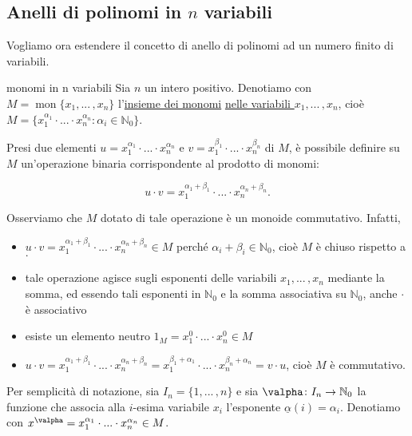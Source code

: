 
\subsection{Anelli di polinomi in $n$ variabili}

\noindent Vogliamo ora estendere il concetto di anello di polinomi ad un numero finito di variabili.

\begin{defn}{monomi in n variabili}
Sia $n$ un intero positivo. Denotiamo con $M=\operatorname{mon}\{x_1,...\,,x_n\}$ l'\underline{insieme dei monomi} 
\underline{nelle variabili $x_1,...\,,x_n$}, cioè $M=\{x_1^{\alpha_1}\cdot ...\cdot x_n^{\alpha_n}: \alpha_i\in\mathbb{N}_0\}$.
\end{defn} 
\vspace{-2mm}
\noindent Presi due elementi $u=x_1^{\alpha_1}\cdot ...\cdot x_n^{\alpha_n}$ e $v=x_1^{\beta_1}\cdot ...\cdot x_n^{\beta_n}$ di $M$, 
è possibile definire su $M$ un'operazione binaria corrispondente al prodotto di monomi: 

\[ u\cdot v=x_1^{\alpha_1+\beta_1}\cdot ...\cdot x_n^{\alpha_n+\beta_n}.\] 

Osserviamo che $M$ dotato di tale operazione è un monoide commutativo. Infatti,

\begin{itemize}
\item $u\cdot v=x_1^{\alpha_1+\beta_1}\cdot ...\cdot x_n^{\alpha_n+\beta_n}\in M$ perché $\alpha_i+\beta_i\in \mathbb{N}_0$, 
cioè $M$ è chiuso rispetto a $\cdot$
\item tale operazione agisce sugli esponenti delle variabili $x_1, ...\,,x_n$ mediante la somma, ed essendo tali esponenti in $\mathbb{N}_0$ 
e la somma associativa su $\mathbb{N}_0$, anche $\cdot$ è associativo
\item esiste un elemento neutro $1_{M}=x_1^0\cdot ... \cdot x_n^0\in M$
\item $u\cdot v=x_1^{\alpha_1+\beta_1}\cdot ...\cdot x_n^{\alpha_n+\beta_n}=x_1^{\beta_1+\alpha_1}\cdot ...\cdot x_n^{\beta_n+\alpha_n}=v\cdot u$, 
cioè $M$ è commutativo.
\end{itemize}

\noindent Per semplicità di notazione, sia $I_n=\{1,...\,,n\}$ e sia $\valpha \colon I_n\to\mathbb{N}_0$ 
la funzione che associa alla $i$-esima variabile $x_i$ l'esponente $\underline{\alpha}(i)=\alpha_i$. 
Denotiamo con $x^{\valpha}=x_1^{\alpha_1}\cdot ... \cdot x_n^{\alpha_n}\in M$. 

